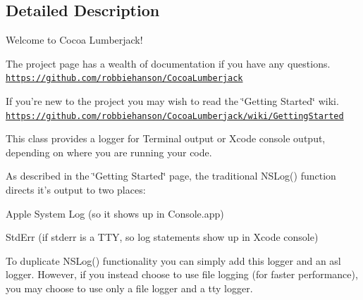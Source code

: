 \subsection{Detailed Description}
Welcome to Cocoa Lumberjack!

The project page has a wealth of documentation if you have any questions. \href{https://github.com/robbiehanson/CocoaLumberjack}{\tt https\-://github.\-com/robbiehanson/\-Cocoa\-Lumberjack}

If you're new to the project you may wish to read the \char`\"{}\-Getting Started\char`\"{} wiki. \href{https://github.com/robbiehanson/CocoaLumberjack/wiki/GettingStarted}{\tt https\-://github.\-com/robbiehanson/\-Cocoa\-Lumberjack/wiki/\-Getting\-Started}

This class provides a logger for Terminal output or Xcode console output, depending on where you are running your code.

As described in the \char`\"{}\-Getting Started\char`\"{} page, the traditional N\-S\-Log() function directs it's output to two places\-:


\begin{DoxyItemize}
\item Apple System Log (so it shows up in Console.\-app)
\item Std\-Err (if stderr is a T\-T\-Y, so log statements show up in Xcode console)
\end{DoxyItemize}

To duplicate N\-S\-Log() functionality you can simply add this logger and an asl logger. However, if you instead choose to use file logging (for faster performance), you may choose to use only a file logger and a tty logger. 

